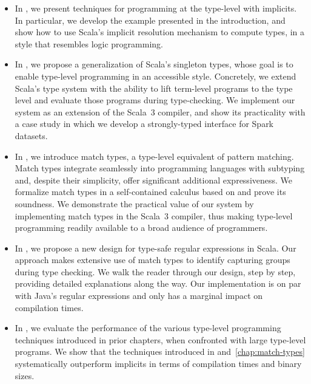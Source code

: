 \begin{itemize}
  \item In , we present techniques for programming at the type-level with implicits.
  In particular, we develop the example presented in the introduction, and show how to use Scala's implicit resolution mechanism to compute types, in a style that resembles logic programming.

  \item In , we propose a generalization of Scala's singleton types, whose goal is to enable type-level programming in an accessible style.
  Concretely, we extend Scala's type system with the ability to lift term-level programs to the type level and evaluate those programs during type-checking.
  We implement our system as an extension of the Scala~3 compiler, and show its practicality with a case study in which we develop a strongly-typed interface for Spark datasets.

  \item In , we introduce match types, a type-level equivalent of pattern matching.
  Match types integrate seamlessly into programming languages with subtyping and, despite their simplicity, offer significant additional expressiveness.
  We formalize match types in a self-contained calculus based on \SystemFsub and prove its soundness.
  We demonstrate the practical value of our system by implementing match types in the Scala~3 compiler, thus making type-level programming readily available to a broad audience of programmers.

  \item In , we propose a new design for type-safe regular expressions in Scala.
  Our approach makes extensive use of match types to identify capturing groups during type checking.
  We walk the reader through our design, step by step, providing detailed explanations along the way.
  Our implementation is on par with Java's regular expressions and only has a marginal impact on compilation times.

  \item In , we evaluate the performance of the various type-level programming techniques introduced in prior chapters, when confronted with large type-level programs.
  We show that the techniques introduced in  and~\ref{chap:match-types} systematically outperform implicits in terms of compilation times and binary sizes.
\end{itemize}

